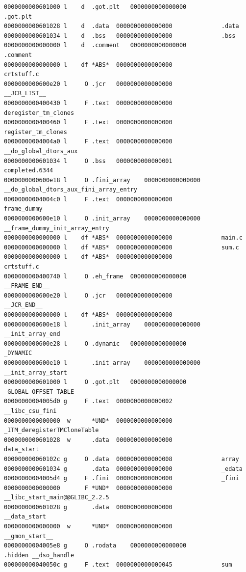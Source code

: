 \documentclass[11pt]{article}
\begin{document}
\begin{enumerate}
\begin{verbatim}
0000000000601000 l    d  .got.plt	0000000000000000              .got.plt
0000000000601028 l    d  .data	0000000000000000              .data
0000000000601034 l    d  .bss	0000000000000000              .bss
0000000000000000 l    d  .comment	0000000000000000              .comment
0000000000000000 l    df *ABS*	0000000000000000              crtstuff.c
0000000000600e20 l     O .jcr	0000000000000000              __JCR_LIST__
0000000000400430 l     F .text	0000000000000000              deregister_tm_clones
0000000000400460 l     F .text	0000000000000000              register_tm_clones
00000000004004a0 l     F .text	0000000000000000              __do_global_dtors_aux
0000000000601034 l     O .bss	0000000000000001              completed.6344
0000000000600e18 l     O .fini_array	0000000000000000              __do_global_dtors_aux_fini_array_entry
00000000004004c0 l     F .text	0000000000000000              frame_dummy
0000000000600e10 l     O .init_array	0000000000000000              __frame_dummy_init_array_entry
0000000000000000 l    df *ABS*	0000000000000000              main.c
0000000000000000 l    df *ABS*	0000000000000000              sum.c
0000000000000000 l    df *ABS*	0000000000000000              crtstuff.c
0000000000400740 l     O .eh_frame	0000000000000000              __FRAME_END__
0000000000600e20 l     O .jcr	0000000000000000              __JCR_END__
0000000000000000 l    df *ABS*	0000000000000000              
0000000000600e18 l       .init_array	0000000000000000              __init_array_end
0000000000600e28 l     O .dynamic	0000000000000000              _DYNAMIC
0000000000600e10 l       .init_array	0000000000000000              __init_array_start
0000000000601000 l     O .got.plt	0000000000000000              _GLOBAL_OFFSET_TABLE_
00000000004005d0 g     F .text	0000000000000002              __libc_csu_fini
0000000000000000  w      *UND*	0000000000000000              _ITM_deregisterTMCloneTable
0000000000601028  w      .data	0000000000000000              data_start
000000000060102c g     O .data	0000000000000008              array
0000000000601034 g       .data	0000000000000000              _edata
00000000004005d4 g     F .fini	0000000000000000              _fini
0000000000000000       F *UND*	0000000000000000              __libc_start_main@@GLIBC_2.2.5
0000000000601028 g       .data	0000000000000000              __data_start
0000000000000000  w      *UND*	0000000000000000              __gmon_start__
00000000004005e8 g     O .rodata	0000000000000000              .hidden __dso_handle
000000000040050c g     F .text	0000000000000045              sum

\end{verbatim}
\end{enumerate}
\end{document}
